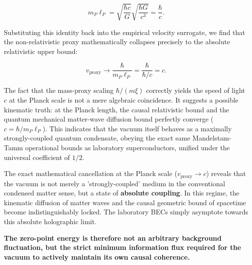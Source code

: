 \documentclass[11pt,a4paper]{article}
\begin{document}
$$m_P \ell_P = \sqrt{\frac{\hbar c}{G}} \sqrt{\frac{\hbar G}{c^3}} = \frac{\hbar}{c}.$$

Substituting this identity back into the empirical velocity surrogate, we find that the non-relativistic proxy mathematically collapses precisely to the absolute relativistic upper bound:

$$v_{\text{proxy}} \to \frac{\hbar}{m_P \ell_P} = \frac{\hbar}{\hbar / c} = c.$$

The fact that the mass-proxy scaling $\hbar/(m\xi)$ correctly yields the speed of light $c$ at the Planck scale is not a mere algebraic coincidence. It suggests a possible kinematic truth: at the Planck length, the causal relativistic bound and the quantum mechanical matter-wave diffusion bound perfectly converge ($c = \hbar/m_P \ell_P$). This indicates that the vacuum itself behaves as a maximally strongly-coupled quantum condensate, obeying the exact same Mandelstam-Tamm operational bounds as laboratory superconductors, unified under the universal coefficient of $1/2$.

The exact mathematical cancellation at the Planck scale ($v_{\text{proxy}} \to c$) reveals that the vacuum is not merely a 'strongly-coupled' medium in the conventional condensed matter sense, but a state of \textbf{absolute coupling}. In this regime, the kinematic diffusion of matter waves and the causal geometric bound of spacetime become indistinguishably locked. The laboratory BECs simply asymptote towards this absolute holographic limit.

\textbf{The zero-point energy is therefore not an arbitrary background fluctuation, but the strict minimum information flux required for the vacuum to actively maintain its own causal coherence.}



\end{document}
